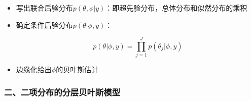 \begin{itemize}
\item
  写出联合后验分布\(p(\theta,\phi|y)\)：即超先验分布，总体分布和似然分布的乘积
\item
  确定条件后验分布\(p(\theta|\phi,y)\)：

  \[p(\theta|\phi,y)=\prod_{j=1}^J p(\theta_j|\phi,y)\]
\item
  边缘化给出\(\phi\)的贝叶斯估计
\end{itemize}

\hypertarget{ux4e8cux4e8cux9879ux5206ux5e03ux7684ux5206ux5c42ux8d1dux53f6ux65afux6a21ux578b}{%
\subsubsection{二、二项分布的分层贝叶斯模型}\label{ux4e8cux4e8cux9879ux5206ux5e03ux7684ux5206ux5c42ux8d1dux53f6ux65afux6a21ux578b}}

